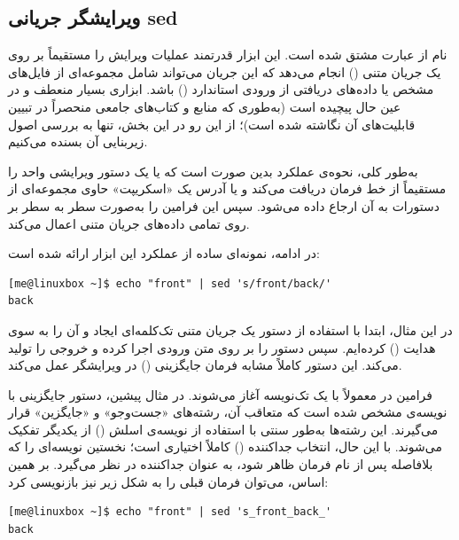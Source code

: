 \subsection{ویرایشگر جریانی sed}

نام  از عبارت  مشتق شده است. این ابزار قدرتمند عملیات ویرایش را مستقیماً بر روی یک جریان متنی () انجام می‌دهد که این جریان می‌تواند شامل مجموعه‌ای از فایل‌های مشخص یا داده‌های دریافتی از ورودی استاندارد () باشد.  ابزاری بسیار منعطف و در عین حال پیچیده است (به‌طوری که منابع و کتاب‌های جامعی منحصراً در تبیین قابلیت‌های آن نگاشته شده است)؛ از این رو در این بخش، تنها به بررسی اصول زیربنایی آن بسنده می‌کنیم.

به‌طور کلی، نحوه‌ی عملکرد  بدین صورت است که یا یک دستور ویرایشی واحد را مستقیماً از خط فرمان دریافت می‌کند و یا آدرس یک «اسکریپت» حاوی مجموعه‌ای از دستورات به آن ارجاع داده می‌شود. سپس  این فرامین را به‌صورت سطر به سطر بر روی تمامی داده‌های جریان متنی اعمال می‌کند.

در ادامه، نمونه‌ای ساده از عملکرد این ابزار ارائه شده است:

\begin{latin}
\begin{lstlisting}
[me@linuxbox ~]$ echo "front" | sed 's/front/back/'
back
\end{lstlisting}
\end{latin}

در این مثال، ابتدا با استفاده از دستور  یک جریان متنی تک‌کلمه‌ای ایجاد و آن را به سوی  هدایت () کرده‌ایم. سپس  دستور  را بر روی متن ورودی اجرا کرده و خروجی  را تولید می‌کند. این دستور کاملاً مشابه فرمان جایگزینی () در ویرایشگر  عمل می‌کند.

فرامین در  معمولاً با یک تک‌نویسه آغاز می‌شوند. در مثال پیشین، دستور جایگزینی با نویسه‌ی  مشخص شده است که متعاقب آن، رشته‌های «جست‌وجو» و «جایگزین» قرار می‌گیرند. این رشته‌ها به‌طور سنتی با استفاده از نویسه‌ی اسلش (\cmd{/}) از یکدیگر تفکیک می‌شوند. با این حال، انتخاب جداکننده () کاملاً اختیاری است؛  نخستین نویسه‌ای را که بلافاصله پس از نام فرمان ظاهر شود، به عنوان جداکننده در نظر می‌گیرد. بر همین اساس، می‌توان فرمان قبلی را به شکل زیر نیز بازنویسی کرد:

\begin{latin}
\begin{lstlisting}
[me@linuxbox ~]$ echo "front" | sed 's_front_back_'
back
\end{lstlisting}
\end{latin}

